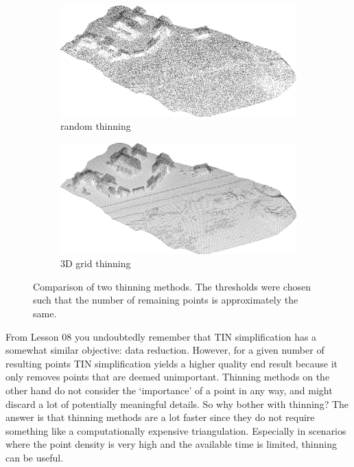 \begin{figure}[htb]
  \centering
  \begin{subfigure}[b]{0.95\linewidth}
    \centering
    \includegraphics[width=\textwidth]{figs/rand01.png}
    \caption{random thinning}
  \end{subfigure}

  \begin{subfigure}[b]{0.95\linewidth}
    \centering
    \includegraphics[width=\textwidth]{figs/voxel08m.png}
    \caption{3D grid thinning}
  \end{subfigure}
\caption{Comparison of two thinning methods. The thresholds were chosen such that the number of remaining points is approximately the same.}
\label{fig:randvsgrid}
\end{figure}

From Lesson 08 you undoubtedly remember that TIN simplification has a somewhat similar objective: data reduction. 
However, for a given number of resulting points TIN simplification yields a higher quality end result because it only removes points that are deemed unimportant.
Thinning methods on the other hand do not consider the `importance' of a point in any way, and might discard a lot of potentially meaningful details.
So why bother with thinning? The answer is that thinning methods are a lot faster since they do not require something like a computationally expensive triangulation.
Especially in scenarios where the point density is very high and the available time is limited, thinning can be useful.


